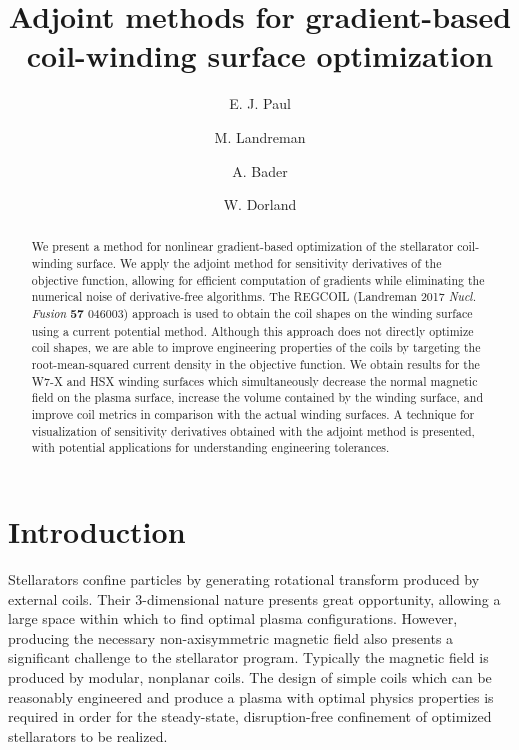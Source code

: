 \documentclass[aps,unsortedaddress]{revtex4-1}
\begin{document}
\title{Adjoint methods for gradient-based coil-winding surface optimization}
\author{E. J. Paul}

\author{M. Landreman}

\author{A. Bader}

\author{W. Dorland}

\begin{abstract}
We present a method for nonlinear gradient-based optimization of the stellarator coil-winding surface. We apply the adjoint method for sensitivity derivatives of the objective function, allowing for efficient computation of gradients while eliminating the numerical noise of derivative-free algorithms. The REGCOIL (Landreman 2017 \textit{Nucl. Fusion} \textbf{57} 046003) approach is used to obtain the coil shapes on the winding surface using a current potential method. Although this approach does not directly optimize coil shapes, we are able to improve engineering properties of the coils by targeting the root-mean-squared current density in the objective function. We obtain results for the W7-X and HSX winding surfaces which simultaneously decrease the normal magnetic field on the plasma surface,  increase the volume contained by the winding surface, and improve coil metrics in comparison with the actual winding surfaces. A technique for visualization of sensitivity derivatives obtained with the adjoint method is presented, with potential applications for understanding engineering tolerances. 
\end{abstract}

\maketitle

\section{Introduction}

Stellarators confine particles by generating rotational transform produced by external coils. Their 3-dimensional nature presents great opportunity, allowing a large space within which to find optimal plasma configurations. However, producing the necessary non-axisymmetric magnetic field also presents a significant challenge to the stellarator program. Typically the magnetic field is produced by modular, nonplanar coils. The design of simple coils which can be reasonably engineered and produce a plasma with optimal physics properties is required in order for the steady-state, disruption-free confinement of optimized stellarators to be realized. 
\end{document}
